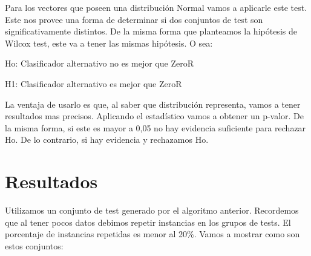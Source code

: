 
Para los vectores que poseen una distribución Normal vamos a aplicarle este test. Este nos provee una forma de determinar si dos conjuntos de test son significativamente distintos. De la misma forma que planteamos la hipótesis de Wilcox test, este va a tener las mismas hipótesis. O sea: 

\vspace{0.5cm}
\hspace{2cm}Ho: Clasificador alternativo no es mejor que ZeroR
\vspace{0.25cm}

\hspace{2cm}H1: Clasificador alternativo es mejor que ZeroR
\vspace{0.5cm}

La ventaja de usarlo es que, al saber que distribución representa, vamos a tener resultados mas precisos. Aplicando el estadístico vamos a obtener un p-valor. De la misma forma, si este es mayor a 0,05 no hay evidencia suficiente para rechazar Ho. De lo contrario, si hay evidencia y rechazamos Ho.

\section{Resultados}

Utilizamos un conjunto de test generado por el algoritmo anterior. Recordemos que al tener pocos datos debimos repetir instancias en los grupos de tests. El porcentaje de instancias repetidas es menor al 20\%. Vamos a mostrar como son estos conjuntos:

\begin{figure}[H]
\centering
\pgfplotsset{width=10cm, height=6cm}
\end{figure}

